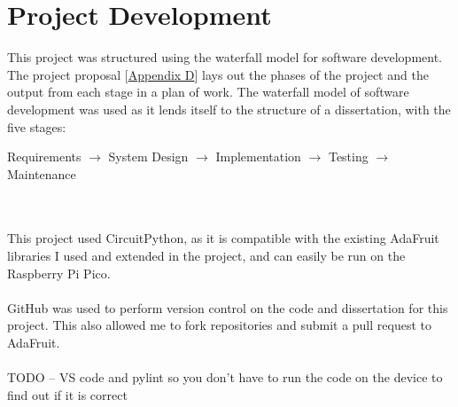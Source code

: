 \documentclass[12pt,a4paper]{report}
\begin{document}
\section{Project Development} 
This project was structured using the waterfall model for software development. The project proposal [\hyperref[appendixD]{Appendix D}] lays out the phases of the project and the output from each stage in a plan of work. The waterfall model of software development was used as it lends itself to the structure of a dissertation, with the five stages: \\
\centerline{Requirements $\rightarrow$ System Design $\rightarrow$ Implementation $\rightarrow$ Testing $\rightarrow$ Maintenance} \\ \\
This project used CircuitPython, as it is compatible with the existing AdaFruit libraries I used and extended in the project, and can easily be run on the Raspberry Pi Pico. \\ \\
GitHub was used to perform version control on the code and dissertation for this project. This also allowed me to fork repositories and submit a pull request to AdaFruit. \\ \\ 
TODO -- VS code and pylint so you don't have to run the code on the device to find out if it is correct 
\end{document}
